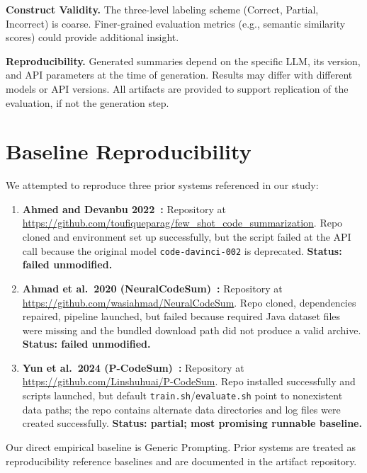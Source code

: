 \documentclass[conference]{IEEEtran}
\begin{document}
\textbf{Construct Validity.}
The three-level labeling scheme (Correct, Partial, Incorrect) is coarse.
Finer-grained evaluation metrics (e.g., semantic similarity scores) could
provide additional insight.

\textbf{Reproducibility.}
Generated summaries depend on the specific LLM, its version, and API
parameters at the time of generation. Results may differ with different
models or API versions. All artifacts are provided to support replication
of the evaluation, if not the generation step.

\section{Baseline Reproducibility}
\label{sec:baseline-reproducibility}

We attempted to reproduce three prior systems referenced in our study:

\begin{enumerate}
  \item \textbf{Ahmed and Devanbu 2022~\cite{ahmed2022fewshot}:}
    Repository at
    \url{https://github.com/toufiqueparag/few_shot_code_summarization}.
    Repo cloned and environment set up successfully, but the script failed
    at the API call because the original model \texttt{code-davinci-002}
    is deprecated. \textbf{Status: failed unmodified.}
  \item \textbf{Ahmad et al.\ 2020 (NeuralCodeSum)~\cite{ahmad2020neuralcodesum}:}
    Repository at \url{https://github.com/wasiahmad/NeuralCodeSum}.
    Repo cloned, dependencies repaired, pipeline launched, but failed because
    required Java dataset files were missing and the bundled download path
    did not produce a valid archive. \textbf{Status: failed unmodified.}
  \item \textbf{Yun et al.\ 2024 (P-CodeSum)~\cite{yun2024pcodesum}:}
    Repository at
    \url{https://github.com/Linshuhuai/P-CodeSum}.
    Repo installed successfully and scripts launched, but default
    \texttt{train.sh}/\texttt{evaluate.sh} point to nonexistent data paths;
    the repo contains alternate data directories and log files were created
    successfully. \textbf{Status: partial; most promising runnable baseline.}
\end{enumerate}

Our direct empirical baseline is Generic Prompting. Prior systems are treated
as reproducibility reference baselines and are documented in the artifact
repository.
\end{document}

